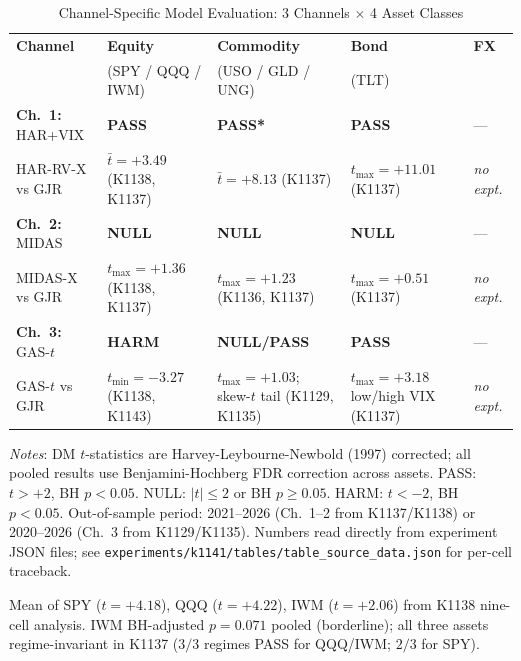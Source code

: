 \begin{table}[H]
\centering
\small
\begin{threeparttable}
\caption{Channel-Specific Model Evaluation: 3 Channels $\times$ 4 Asset Classes}
\label{tab:channel_x_asset}
\begin{tabular}{@{}p{3.2cm}p{3.5cm}p{3.5cm}p{2.8cm}p{1.8cm}@{}}
\toprule
\textbf{Channel} &
\textbf{Equity} &
\textbf{Commodity} &
\textbf{Bond} &
\textbf{FX} \\
& (SPY / QQQ / IWM) & (USO / GLD / UNG) & (TLT) & \\
\midrule
\textbf{Ch.\ 1:} HAR+VIX &
\textbf{PASS} &
\textbf{PASS*} &
\textbf{PASS} &
--- \\
\small HAR-RV-X vs GJR &
\small $\bar{t}=+3.49$\tnote{a} (K1138, K1137) &
\small $\bar{t}=+8.13$\tnote{b} (K1137) &
\small $t_{\max}=+11.01$ (K1137) &
\small \textit{no expt.} \\
\midrule
\textbf{Ch.\ 2:} MIDAS &
\textbf{NULL} &
\textbf{NULL} &
\textbf{NULL} &
--- \\
\small MIDAS-X vs GJR &
\small $t_{\max}=+1.36$ (K1138, K1137) &
\small $t_{\max}=+1.23$ (K1136, K1137) &
\small $t_{\max}=+0.51$ (K1137) &
\small \textit{no expt.} \\
\midrule
\textbf{Ch.\ 3:} GAS-$t$ &
\textbf{HARM} &
\textbf{NULL/PASS}\tnote{†} &
\textbf{PASS} &
--- \\
\small GAS-$t$ vs GJR &
\small $t_{\min}=-3.27$ (K1138, K1143) &
\small $t_{\max}=+1.03$; skew-$t$ tail\tnote{†} (K1129, K1135) &
\small $t_{\max}=+3.18$ low/high VIX (K1137) &
\small \textit{no expt.} \\
\bottomrule
\end{tabular}
\begin{tablenotes}
\footnotesize
\item \textit{Notes}: DM $t$-statistics are Harvey-Leybourne-Newbold (1997) corrected; all pooled results use
  Benjamini-Hochberg FDR correction across assets. PASS: $t > +2$, BH $p < 0.05$.
  NULL: $|t| \leq 2$ or BH $p \geq 0.05$. HARM: $t < -2$, BH $p < 0.05$.
  Out-of-sample period: 2021--2026 (Ch.\ 1--2 from K1137/K1138) or 2020--2026 (Ch.\ 3 from K1129/K1135).
  Numbers read directly from experiment JSON files; see
  \texttt{experiments/k1141/tables/table\_source\_data.json} for per-cell traceback.
\item[\tnote{a}] Mean of SPY ($t = +4.18$), QQQ ($t = +4.22$), IWM ($t = +2.06$) from K1138 nine-cell analysis.
  IWM BH-adjusted $p = 0.071$ pooled (borderline); all three assets regime-invariant in K1137 ($3/3$ regimes PASS for QQQ/IWM; $2/3$ for SPY).

\end{tablenotes}
\end{threeparttable}
\end{table}
